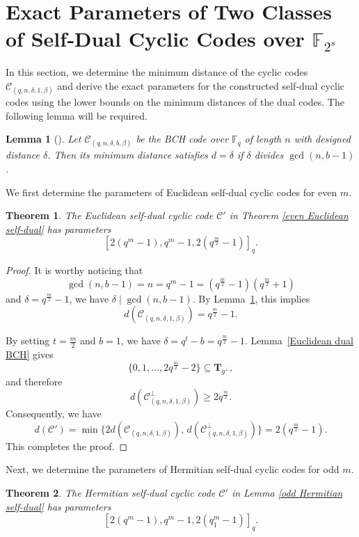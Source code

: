 \documentclass[10pt,a4paper]{amsart}
\newtheorem{theorem}{Theorem}
\newtheorem{lemma}{Lemma}
\begin{document}
\section{Exact Parameters of Two Classes of Self‑Dual Cyclic Codes over $\mathbb{F}_{2^s}$}
\label{4}
In this section, we determine the minimum distance of the cyclic codes $\mathcal{C}_{(q,n,\delta,1,\beta)}$ and derive the exact parameters for the constructed self-dual cyclic codes using the lower bounds on the minimum distances of the dual codes. The following lemma will be required.

\begin{lemma}[\cite{li2017lcd}]
    \label{weight}
    Let $\mathcal{C}_{(q,n,\delta,b,\beta)}$ be the BCH code over $\mathbb{F}_q$ of length $n$ with designed distance $\delta$. Then its minimum distance satisfies $d=\delta$ if $\delta$ divides $\gcd(n,b-1)$.
\end{lemma}

We first determine the parameters of Euclidean self‑dual cyclic codes for even $m$.
\begin{theorem}
    \label{exact Euclidean}
    The Euclidean self-dual cyclic code $\mathcal{C}'$ in Theorem \ref{even Euclidean self-dual} has parameters \[[2(q^m-1),q^m-1,2(q^\frac{m}{2}-1)]_q.\]
\end{theorem}

\begin{proof}
It is worthy noticing that
\[
\gcd(n, b-1) = n = q^m - 1 = (q^{\frac{m}{2}} - 1)(q^{\frac{m}{2}} + 1)
\]
and $\delta = q^{\frac{m}{2}} - 1$, we have $\delta \mid \gcd(n, b-1)$. By Lemma~\ref{weight}, this implies
\[
d(\mathcal{C}_{(q,n,\delta,1,\beta)}) = q^{\frac{m}{2}} - 1.
\]

By setting $t = \frac{m}{2}$ and $b = 1$, we have $\delta = q^t - b = q^{\frac{m}{2}} - 1$. Lemma~\ref{Euclidean dual BCH} gives
\[
\{0,1,\dots,2q^{\frac{m}{2}} - 2\} \subseteq \mathbf{T}_{g^\perp},
\]
and therefore
\[
d(\mathcal{C}^{\perp}_{(q,n,\delta,1,\beta)}) \ge 2q^{\frac{m}{2}}.
\] Consequently, we have
\[
d(\mathcal{C}') = \min\{2d(\mathcal{C}_{(q,n,\delta,1,\beta)}),\, d(\mathcal{C}^{\perp}_{(q,n,\delta,1,\beta)})\}
= 2(q^{\frac{m}{2}} - 1).
\]
This completes the proof.
\end{proof}

Next, we determine the parameters of Hermitian self-dual cyclic codes for odd $m$.
\begin{theorem}
    \label{Exact Hermitian}
    The Hermitian self-dual cyclic code $\mathcal{C}'$ in Lemma \ref{odd Hermitian self-dual} has parameters \[[2(q^m-1),q^m-1,2(q_1^m-1)]_q.\]
\end{theorem}
\end{document}
